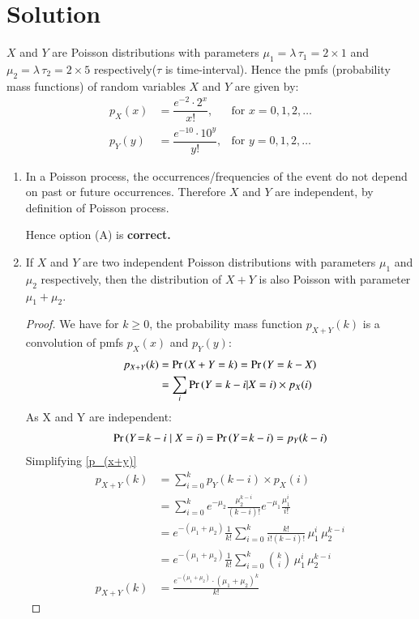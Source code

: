 \documentclass[journal,12pt,twocolumn]{IEEEtran}
\begin{document}
\section{Solution}
    \par $X$ and $Y$ are Poisson distributions with parameters $\mu_1 = \lambda \, \tau_1 = 2 \times 1$ and $\mu_2 = \lambda \, \tau_2 = 2 \times 5$ respectively($\tau$ is time-interval). 
    Hence the pmfs (probability mass functions) of random variables $X$ and $Y$ are given by:
    \begin{align}
        p_X(x) &= \dfrac{e^{-2}\cdot 2^{x}}{x!}, & \text{for } x=0,1,2,\dots \label{pmf(X)}\\
        p_Y(y) &= \dfrac{e^{-10}\cdot 10^{y}}{y!}, & \text{for } y=0,1,2,\dots \label{pmf(Y)}
    \end{align}
\begin{enumerate}[label=\textbf{(\Alph*)}]
    \item In a Poisson process, the occurrences/frequencies of the event do not depend on past or future occurrences. Therefore $X$ and $Y$ are independent, by definition of Poisson process.

    Hence option (A) is \textbf{correct.\\}

    \item \begin{lemma}\label{lemma_X+Y}
        If $X$ and $Y$ are two independent Poisson distributions with parameters $\mu_1$ and $\mu_2$ respectively, then the distribution of $X+Y$ is also Poisson with parameter $\mu_1 + \mu_2$. 
    \end{lemma}
    \begin{proof}
         We have for $k \geq 0$, the probability mass function $p_{X+Y}(k)$ is a convolution of pmfs $p_X(x)$ and $p_Y(y)$: 
    \begin{align}
       p_{X+Y}(k) &= \pr{X+ Y = k} = \pr{Y = k - X}\\
       &= \sum_{i}\pr{Y = k - i| X=i}\times p_X(i)\label{p_(x+y)}
    \end{align}
    As X and Y are independent: 
    \begin{align}
        \Pr\left(Y\! =\! k - i \mid X=i\right) = \Pr\left(Y\! = \! k - i\right) = p_Y(k-i)
    \end{align}
    Simplifying \eqref{p_(x+y)}
    \begin{align}
        p_{X+Y}(k) &= \sum_{i=0}^k p_Y(k-i) \times p_X(i)\\
        &= \sum_{i=0}^k e^{-\mu_2}\frac{\mu_2^{k-i}}{(k-i)!}e^{-\mu_1}\frac{\mu_1^i}{i!}\\
        &= e^{-(\mu_1 + \mu_2)}\frac 1{k!}\sum_{i=0}^k \frac{k!}{i!(k-i)!}\,\mu_1^i\,\mu_2^{k-i}\\
        &= e^{-(\mu_1 + \mu_2)}\frac 1{k!}\sum_{i=0}^k {k\choose i}\, \mu_1^i\,\mu_2^{k-i}\\
        p_{X+Y}(k) &= \frac{e^{-(\mu_1 + \mu_2)} \cdot (\mu_1 + \mu_2)^k}{k!}
    \end{align}
    \end{proof}
    

\end{enumerate}
\end{document}
